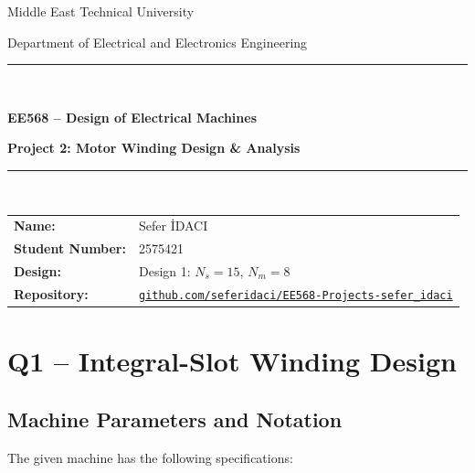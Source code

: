 \documentclass[12pt,a4paper]{article}
\begin{document}
\begin{titlepage}
  \centering
  \vspace*{3cm}
  {\Large Middle East Technical University \par}
  \vspace{0.4cm}
  {\large Department of Electrical and Electronics Engineering \par}
  \vspace{3cm}
  \rule{\linewidth}{0.5pt}\\[0.5cm]
  {\LARGE\bfseries EE568 -- Design of Electrical Machines \par}
  \vspace{0.4cm}
  {\large\bfseries Project 2: Motor Winding Design \& Analysis \par}
  \rule{\linewidth}{0.5pt}\\[2cm]
  \begin{tabular}{ll}
    \textbf{Name:}           & Sefer \.{I}DACI \\[6pt]
    \textbf{Student Number:} & 2575421          \\[6pt]
    \textbf{Design:}         & Design 1: $N_s=15$, $N_m=8$ \\[6pt]
    \textbf{Repository:}     & \href{https://github.com/seferidaci/EE568-Projects-sefer_idaci}{\nolinkurl{github.com/seferidaci/EE568-Projects-sefer_idaci}} \\[6pt]
  \end{tabular}
  \vfill

\end{titlepage}

\setcounter{tocdepth}{1}
\tableofcontents
\newpage

\section{Q1 -- Integral-Slot Winding Design}
\label{sec:q1}

\subsection{Machine Parameters and Notation}

The given machine has the following specifications:
\end{document}
